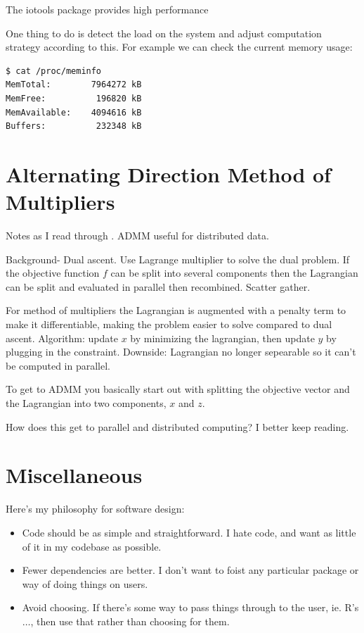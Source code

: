 \documentclass[12pt]{article}
\begin{document}
The iotools package provides high performance

One thing to do is detect the load on the system and adjust computation
strategy according to
this. For example we can check the current memory usage:

\begin{verbatim}
$ cat /proc/meminfo
MemTotal:        7964272 kB
MemFree:          196820 kB
MemAvailable:    4094616 kB
Buffers:          232348 kB
\end{verbatim}

\appendix

\section{Alternating Direction Method of Multipliers}

Notes as I read through \cite{boyd2011distributed}. ADMM useful for distributed
data.

Background- Dual ascent. Use Lagrange multiplier to solve the dual problem.
If the objective function $f$ can be split into several components then the
Lagrangian can be split and evaluated in parallel then recombined. Scatter
gather.

For method of multipliers the Lagrangian is augmented with a penalty term
to make it differentiable, making the problem easier to solve compared to
dual ascent. Algorithm: update $x$ by minimizing the lagrangian, then
update $y$ by plugging in the constraint. Downside: Lagrangian no longer
sepearable so it can't be computed in parallel.

To get to ADMM you basically start out with splitting the objective vector
and the Lagrangian into two components, $x$ and $z$.

How does this get to parallel and distributed computing? I better keep
reading.


\section{Miscellaneous}

Here's my philosophy for software design:

\begin{itemize}
    \item Code should be as simple and straightforward. I hate code, and want as
        little of it in my codebase as possible.
    \item Fewer dependencies are better. I don't want to foist any
        particular package or way of doing things on users.
    \item Avoid choosing. If there's some way to pass things through to the
        user, ie. R's $\dots$, then use that rather than choosing for them.
\end{itemize}




 
\end{document}

